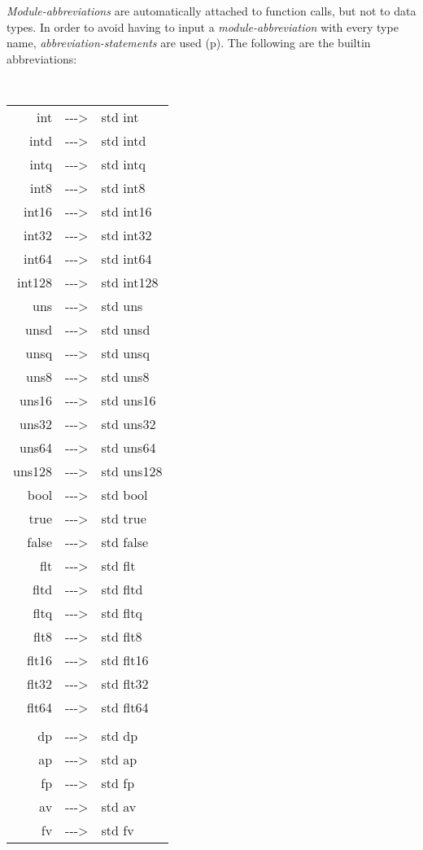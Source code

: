 \documentclass[12pt]{article}
\newcommand{\ABV}{-{}-{}->}
\newcommand{\pagref}[1]{p\pageref{#1}}
\begin{document}
{\em Module-abbreviations} are automatically attached to function
calls, but not to data types.  In order to avoid having to
input a {\em module-abbreviation} with every type name, 
{\em abbreviation-statements} are used (\pagref{ABBREVIATION-STATEMENT}).
The following are the builtin abbreviations:
\begin{center}
\tt
\begin{tabular}{rcl}
int		& \ABV & std int \\
intd		& \ABV & std intd \\
intq		& \ABV & std intq \\
int8		& \ABV & std int8 \\
int16		& \ABV & std int16 \\
int32		& \ABV & std int32 \\
int64		& \ABV & std int64 \\
int128		& \ABV & std int128
\\[1ex]
uns		& \ABV & std uns \\
unsd		& \ABV & std unsd \\
unsq		& \ABV & std unsq \\
uns8		& \ABV & std uns8 \\
uns16		& \ABV & std uns16 \\
uns32		& \ABV & std uns32 \\
uns64		& \ABV & std uns64 \\
uns128		& \ABV & std uns128
\\[1ex]
bool		& \ABV & std bool \\
true		& \ABV & std true \\
false		& \ABV & std false
\\[1ex]
flt		& \ABV & std flt \\
fltd		& \ABV & std fltd \\
fltq		& \ABV & std fltq \\
flt8		& \ABV & std flt8 \\
flt16		& \ABV & std flt16 \\
flt32		& \ABV & std flt32 \\
flt64		& \ABV & std flt64 \\
\\[1ex]
dp		& \ABV & std dp \\
ap		& \ABV & std ap \\
fp		& \ABV & std fp \\
av		& \ABV & std av \\
fv		& \ABV & std fv \\
\end{tabular}
\end{center}
\end{document}
